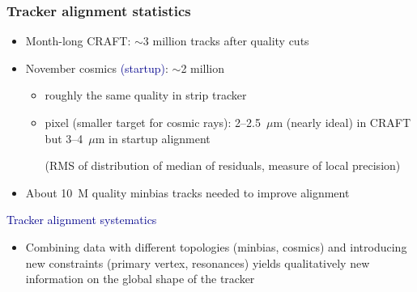 \documentclass[compress]{beamer}
\begin{document}
\begin{frame}
\frametitle{Tracker alignment statistics}

\begin{itemize}\setlength{\itemsep}{0.25 cm}
\item Month-long CRAFT: $\sim$3 million tracks after quality cuts

\item November cosmics \textcolor{darkblue}{(startup)}: $\sim$2 million
\begin{itemize}
\item roughly the same quality in strip tracker
\item pixel (smaller target for cosmic rays): 2--2.5~$\mu$m (nearly
  ideal) in CRAFT but 3--4~$\mu$m in startup alignment

{\scriptsize (RMS of distribution of median of residuals, measure of local precision)}
\end{itemize}

\item About 10~M quality minbias tracks needed to improve alignment
\end{itemize}

\vfill
\hspace{-0.83 cm} \textcolor{darkblue}{\Large Tracker alignment systematics}

\vspace{0.1 cm}
\begin{itemize}
\item Combining data with different topologies (minbias, cosmics) and
  introducing new constraints (primary vertex, resonances) yields
  qualitatively new information on the global shape of the tracker
\end{itemize}
\end{frame}
\end{document}
